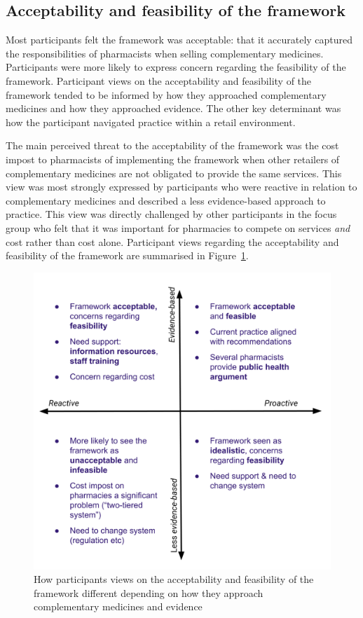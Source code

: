 \documentclass[11pt,a4paper]{article}
\begin{document}
\subsection{Acceptability and feasibility of the
framework}\label{acceptability-and-feasibility-of-the-framework}

Most participants felt the framework was acceptable: that it accurately
captured the responsibilities of pharmacists when selling complementary
medicines. Participants were more likely to express concern regarding
the feasibility of the framework. Participant views on the acceptability
and feasibility of the framework tended to be informed by how they
approached complementary medicines and how they approached evidence. The
other key determinant was how the participant navigated practice within
a retail environment.

The main perceived threat to the acceptability of the framework was the
cost impost to pharmacists of implementing the framework when other
retailers of complementary medicines are not obligated to provide the
same services. This view was most strongly expressed by participants who
were reactive in relation to complementary medicines and described a
less evidence-based approach to practice. This view was directly
challenged by other participants in the focus group who felt that it was
important for pharmacies to compete on services \emph{and} cost rather
than cost alone. Participant views regarding the acceptability and
feasibility of the framework are summarised in Figure~\ref{accfeas}.

\begin{figure}
\centering
\includegraphics{files/CMEthics_accfeas.png}
\caption{How participants views on the acceptability and feasibility of
the framework different depending on how they approach complementary
medicines and evidence \label{accfeas}}
\end{figure}
\end{document}
